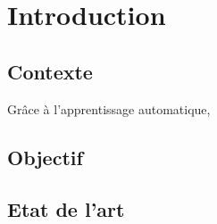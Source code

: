 \chapter{Introduction}

\section{Contexte}
Grâce à l'apprentissage automatique, 

\section{Objectif}

\section{Etat de l'art}